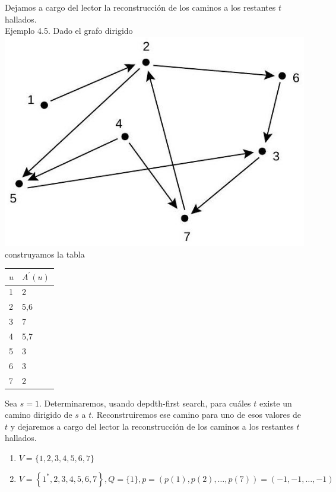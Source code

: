 \documentclass[10pt]{article}
\begin{document}
Dejamos a cargo del lector la reconstrucción de los caminos a los restantes $t$ hallados.\\
Ejemplo 4.5. Dado el grafo dirigido\\
\includegraphics[max width=\textwidth, center]{2025_09_05_93c7c1835f249f70c0eeg-11}\\
construyamos la tabla

\begin{center}
\begin{tabular}{|l|l|}
\hline
$u$ & $A^{\prime}(u)$ \\
\hline
1 & 2 \\
\hline
2 & 5,6 \\
\hline
3 & 7 \\
\hline
4 & 5,7 \\
\hline
5 & 3 \\
\hline
6 & 3 \\
\hline
7 & 2 \\
\hline
\end{tabular}
\end{center}

Sea $s=1$. Determinaremos, usando depdth-first search, para cuáles $t$ existe un camino dirigido de $s$ a $t$. Reconstruiremos ese camino para uno de esos valores de $t$ y dejaremos a cargo del lector la reconstrucción de los caminos a los restantes $t$ hallados.

\begin{enumerate}
  \item $V=\{1,2,3,4,5,6,7\}$
  \item $V=\left\{1^{*}, 2,3,4,5,6,7\right\}, Q=\{1\}, p=(p(1), p(2), \ldots, p(7))=(-1,-1, \ldots,-1)$
\end{enumerate}
\end{document}
